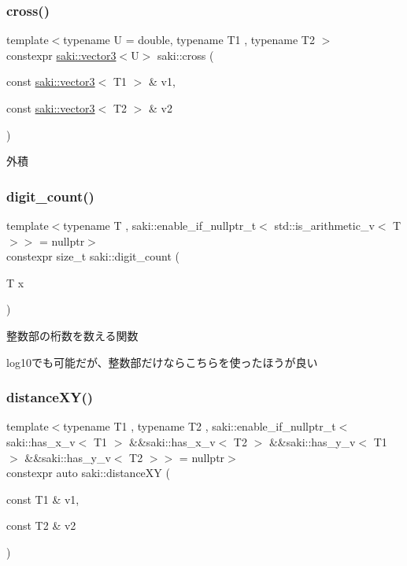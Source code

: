 \subsubsection{\texorpdfstring{cross()}{cross()}\hspace{0.1cm}{\footnotesize\ttfamily [2/2]}}
{\footnotesize\ttfamily template$<$typename U  = double, typename T1 , typename T2 $>$ \\
constexpr \mbox{\hyperlink{classsaki_1_1vector3}{saki\+::vector3}}$<$U$>$ saki\+::cross (\begin{DoxyParamCaption}\item[{const \mbox{\hyperlink{classsaki_1_1vector3}{saki\+::vector3}}$<$ T1 $>$ \&}]{v1,  }\item[{const \mbox{\hyperlink{classsaki_1_1vector3}{saki\+::vector3}}$<$ T2 $>$ \&}]{v2 }\end{DoxyParamCaption})}



外積 

\mbox{\label{namespacesaki_a467dee57b7bbe101146713a82acfe95e}} 
\subsubsection{\texorpdfstring{digit\+\_\+count()}{digit\_count()}}
{\footnotesize\ttfamily template$<$typename T , saki\+::enable\+\_\+if\+\_\+nullptr\+\_\+t$<$ std\+::is\+\_\+arithmetic\+\_\+v$<$ T $>$$>$  = nullptr$>$ \\
constexpr size\+\_\+t saki\+::digit\+\_\+count (\begin{DoxyParamCaption}\item[{T}]{x }\end{DoxyParamCaption})}



整数部の桁数を数える関数 

log10でも可能だが、整数部だけならこちらを使ったほうが良い \mbox{\label{namespacesaki_ae6eddecfb6a747238185b21c8ee1cd60}} 
\subsubsection{\texorpdfstring{distance\+X\+Y()}{distanceXY()}}
{\footnotesize\ttfamily template$<$typename T1 , typename T2 , saki\+::enable\+\_\+if\+\_\+nullptr\+\_\+t$<$ saki\+::has\+\_\+x\+\_\+v$<$ T1 $>$ \&\&saki\+::has\+\_\+x\+\_\+v$<$ T2 $>$ \&\&saki\+::has\+\_\+y\+\_\+v$<$ T1 $>$ \&\&saki\+::has\+\_\+y\+\_\+v$<$ T2 $>$$>$  = nullptr$>$ \\
constexpr auto saki\+::distance\+XY (\begin{DoxyParamCaption}\item[{const T1 \&}]{v1,  }\item[{const T2 \&}]{v2 }\end{DoxyParamCaption})}



